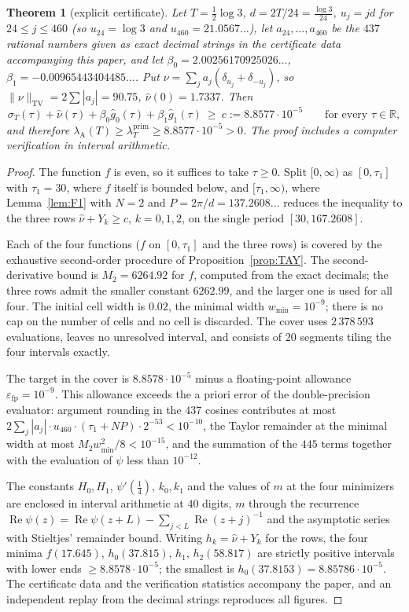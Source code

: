 \documentclass[11pt]{amsart}
\newtheorem{theorem}{Theorem}[section]
\theoremstyle{definition}
\theoremstyle{remark}
\newcommand{\R}{\mathbb R}
\newcommand{\Rel}{\operatorname{Re}}
\newcommand{\TV}{\operatorname{TV}}
\newcommand{\lamP}{\lambda^{\mathrm{prim}}_T}
\newcommand{\lamA}{\lambda_{\mathrm A}(T)}
\newcommand{\sT}{\sigma_T}
\newcommand{\gh}[1]{\widehat g_{#1}}
\newcommand{\nuh}{\widehat\nu}
\begin{document}
\begin{theorem}[explicit certificate]\label{thm:C}
Let $T=\frac12\log3$, $d=2T/24=\frac{\log3}{24}$,
$u_j=jd$ for $24\le j\le460$ (so $u_{24}=\log3$ and $u_{460}=21.0567\ldots$), let
$a_{24},\dots,a_{460}$ be the $437$ rational numbers given as exact decimal strings in the
certificate data accompanying this paper, and let
$\beta_0=2.00256170925026\ldots$, $\beta_1=-0.00965443404485\ldots$. Put
$\nu=\sum_ja_j(\delta_{u_j}+\delta_{-u_j})$, so $\|\nu\|_{\TV}=2\sum|a_j|=90.75$, $\nuh(0)=1.7337$.
Then
\[
\sT(\tau)+\nuh(\tau)+\beta_0\gh0(\tau)+\beta_1\gh1(\tau)\ \ge\ c:=8.8577\cdot10^{-5}\qquad\text{for every }\tau\in\R,
\]
and therefore $\lamA\ge\lamP\ge8.8577\cdot10^{-5}>0$. The proof includes a computer verification
in interval arithmetic.
\end{theorem}

\begin{proof}
The function $f$ is even, so it suffices to take $\tau\ge0$. Split $[0,\infty)$ as $[0,\tau_1]$
with $\tau_1=30$, where $f$ itself is bounded below, and $[\tau_1,\infty)$, where
Lemma~\ref{lem:F1} with $N=2$ and $P=2\pi/d=137.2608\ldots$ reduces the inequality to the three
rows $\nuh+Y_k\ge c$, $k=0,1,2$, on the single period $[30,167.2608]$.

Each of the four functions ($f$ on $[0,\tau_1]$ and the three rows) is covered by the exhaustive
second-order procedure of Proposition~\ref{prop:TAY}. The second-derivative
bound is $M_2=6264.92$ for $f$, computed from the exact decimals; the three rows admit the smaller
constant $6262.99$, and the larger one is used for all four. The initial cell width is $0.02$, the
minimal width $w_{\min}=10^{-9}$; there is no cap on the number of cells and no cell is discarded.
The cover uses $2\,378\,593$ evaluations, leaves no unresolved interval, and consists of $20$
segments tiling the four intervals exactly.

The target in the cover is $8.8578\cdot10^{-5}$ minus a floating-point allowance
$\varepsilon_{\mathrm{fp}}=10^{-9}$. This allowance exceeds the a priori error of the double-precision
evaluator: argument rounding in the $437$ cosines contributes at most
$2\sum_j|a_j|\cdot u_{460}\cdot(\tau_1+NP)\cdot2^{-53}<10^{-10}$, the Taylor remainder at the minimal
width at most $M_2w_{\min}^2/8<10^{-15}$, and the summation of the $445$ terms together with the
evaluation of $\psi$ less than $10^{-12}$.

The constants $H_0,H_1$, $\psi'(\frac14)$, $k_0,k_1$ and the values of $m$ at the four minimizers
are enclosed in interval arithmetic at $40$ digits, $m$ through the recurrence
$\Rel\psi(z)=\Rel\psi(z+L)-\sum_{j<L}\Rel(z+j)^{-1}$ and the asymptotic series with Stieltjes'
remainder bound. Writing $h_k=\nuh+Y_k$ for the rows, the four minima $f(17.645)$, $h_0(37.815)$, $h_1$, $h_2(58.817)$
are strictly positive intervals with lower ends $\ge8.8578\cdot10^{-5}$; the smallest is
$h_0(37.8153)=8.85786\cdot10^{-5}$. The certificate data and the verification statistics accompany
the paper, and an independent replay from the decimal strings reproduces all
figures.
\end{proof}
\end{document}
